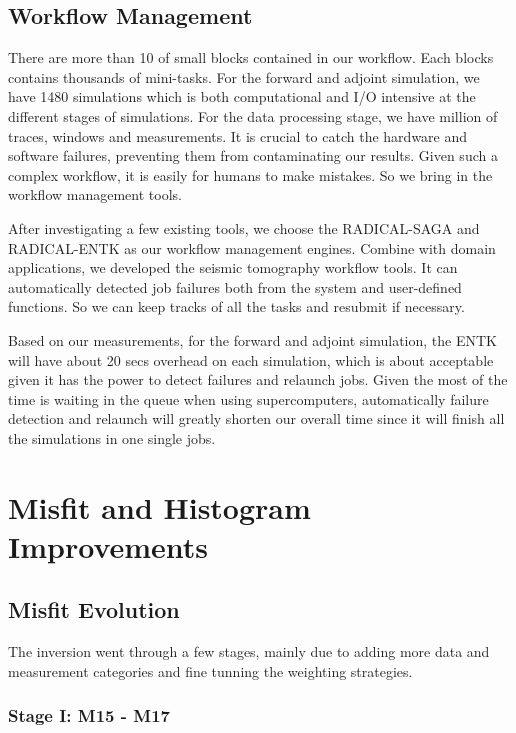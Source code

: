 \documentclass[extra,mreferee]{gji}
\begin{document}
\citep{krischer2016adaptable}

\subsection{Workflow Management}

There are more than 10 of small blocks contained in our workflow. Each blocks contains thousands of mini-tasks. For the forward and adjoint simulation, we have 1480 simulations which is both computational and I/O intensive at the different stages of simulations. For the data processing stage, we have million of traces, windows and measurements. It is crucial to catch the hardware and software failures, preventing them from contaminating our results. Given such a complex workflow, it is easily for humans to make mistakes. So we bring in the workflow management tools.

After investigating a few existing tools, we choose the RADICAL-SAGA and RADICAL-ENTK as our workflow management engines. Combine with domain applications, we developed the seismic tomography workflow tools. It can automatically detected job failures both from the system and user-defined functions. So we can keep tracks of all the tasks and resubmit if necessary.

Based on our measurements, for the forward and adjoint simulation, the ENTK will have about 20 secs overhead on each simulation, which is about acceptable given it has the power to detect failures and relaunch jobs. Given the most of the time is waiting in the queue when using supercomputers, automatically failure detection and relaunch will greatly shorten our overall time since it will finish all the simulations in one single jobs.


\section{Misfit and Histogram Improvements}

\subsection{Misfit Evolution}

The inversion went through a few stages, mainly due to adding more data
and measurement categories and fine tunning the weighting strategies.

\subsubsection{Stage I: M15 - M17}
\end{document}
